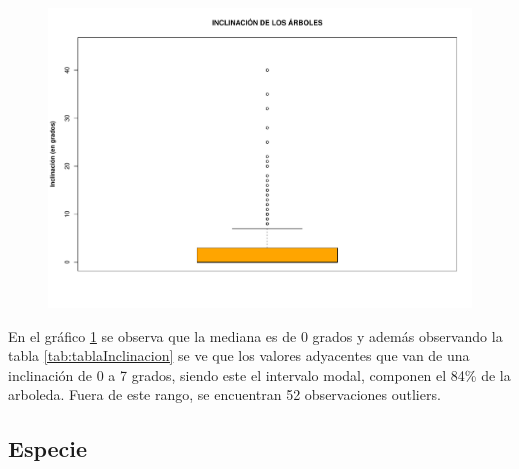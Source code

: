 \documentclass[11pt]{article}
\begin{document}
\begin{figure}[h!]
  \begin{center}
    \includegraphics[width=0.9\linewidth]{boxInclinacion.pdf}
    \caption{}
    \label{fig:boxInclinacion}
  \end{center}
\end{figure}

\begin{justify}
  En el gráfico \ref{fig:boxInclinacion} se observa que la mediana
  es de 0 grados y además observando la tabla \ref{tab:tablaInclinacion}
  se ve que los valores adyacentes que van de una inclinación de 0 a 7 grados,
  siendo este el intervalo modal, componen el 84\% de la arboleda.
  Fuera de este rango, se encuentran 52 observaciones outliers.
\end{justify}


\subsection{Especie}
\end{document}
